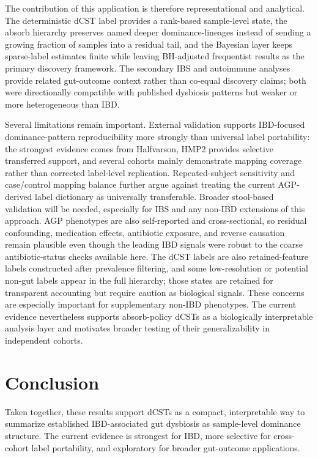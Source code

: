 \documentclass[
  11pt,
]{article}
\begin{document}
The contribution of this application is therefore representational and
analytical. The deterministic dCST label provides a rank-based
sample-level state, the absorb hierarchy preserves named deeper
dominance-lineages instead of sending a growing fraction of samples into
a residual tail, and the Bayesian layer keeps sparse-label estimates
finite while leaving BH-adjusted frequentist results as the primary
discovery framework. The secondary IBS and autoimmune analyses provide
related gut-outcome context rather than co-equal discovery claims; both
were directionally compatible with published dysbiosis patterns but
weaker or more heterogeneous than IBD.

Several limitations remain important. External validation supports
IBD-focused dominance-pattern reproducibility more strongly than
universal label portability: the strongest evidence comes from
Halfvarson, HMP2 provides selective transferred support, and several
cohorts mainly demonstrate mapping coverage rather than corrected
label-level replication. Repeated-subject sensitivity and case/control
mapping balance further argue against treating the current AGP-derived
label dictionary as universally transferable. Broader stool-based
validation will be needed, especially for IBS and any non-IBD extensions
of this approach. AGP phenotypes are also
self-reported and cross-sectional, so
residual confounding, medication effects, antibiotic exposure, and
reverse causation remain plausible even though the leading IBD signals
were robust to the coarse antibiotic-status checks available here. The dCST labels are also
retained-feature labels constructed after prevalence filtering, and some
low-resolution or potential non-gut labels appear in the full hierarchy;
those states are retained for transparent accounting but require caution
as biological signals. These concerns are especially important for
supplementary non-IBD phenotypes. The current evidence nevertheless
supports absorb-policy dCSTs as a biologically interpretable analysis
layer and motivates broader testing of their generalizability in
independent cohorts.

\section{Conclusion}\label{conclusion}

Taken together, these results support dCSTs as a compact, interpretable
way to summarize established IBD-associated gut dysbiosis as
sample-level dominance structure. The current evidence is strongest for
IBD, more selective for cross-cohort label portability, and exploratory
for broader gut-outcome applications.
\end{document}
